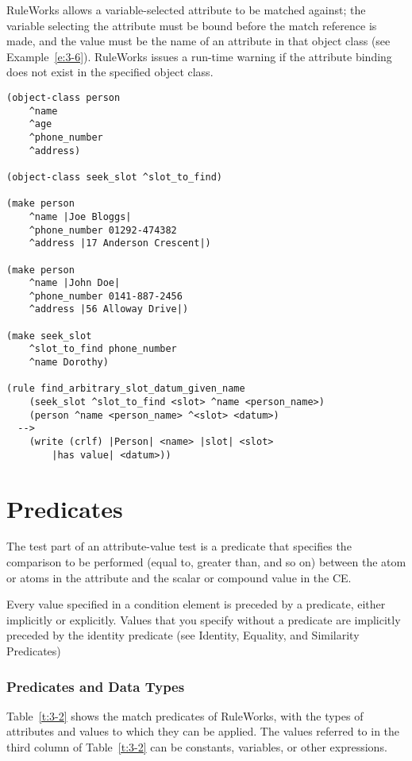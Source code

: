 RuleWorks allows a variable-selected attribute to be matched against;
the variable selecting the attribute must be bound before the match
reference is made, and the value must be the name of an attribute in
that object class (see Example~\ref{e:3-6}). RuleWorks issues a run-time
warning if the attribute binding does not exist in the specified
object class.

\begin{exampl}
\begin{verbatim}
(object-class person
    ^name
    ^age
    ^phone_number
    ^address)

(object-class seek_slot ^slot_to_find)

(make person
    ^name |Joe Bloggs|
    ^phone_number 01292-474382
    ^address |17 Anderson Crescent|)

(make person
    ^name |John Doe|
    ^phone_number 0141-887-2456
    ^address |56 Alloway Drive|)

(make seek_slot
    ^slot_to_find phone_number
    ^name Dorothy)

(rule find_arbitrary_slot_datum_given_name
    (seek_slot ^slot_to_find <slot> ^name <person_name>)
    (person ^name <person_name> ^<slot> <datum>)
  -->
    (write (crlf) |Person| <name> |slot| <slot> 
        |has value| <datum>))
\end{verbatim}
\label{e:3-6}
\end{exampl}

\section{Predicates}

The test part of an attribute-value test is a predicate that specifies
the comparison to be performed (equal to, greater than, and so on)
between the atom or atoms in the attribute and the scalar or compound
value in the CE.

Every value specified in a condition element is preceded by a
predicate, either implicitly or explicitly. Values that you specify
without a predicate are implicitly preceded by the identity predicate
(see Identity, Equality, and Similarity Predicates)

\subsubsection*{Predicates and Data Types}

Table~\ref{t:3-2} shows the match predicates of RuleWorks, with the
types of attributes and values to which they can be applied. The
values referred to in the third column of Table~\ref{t:3-2} can be constants,
variables, or other expressions.

